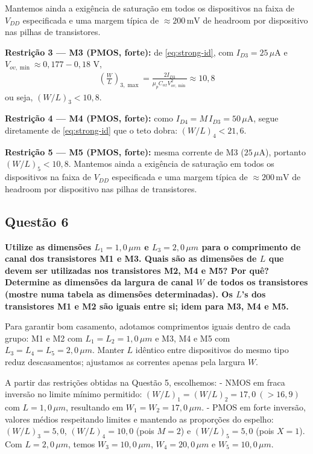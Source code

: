 ﻿\documentclass[12pt,a4paper]{article}
\begin{document}
Mantemos ainda a exigência de saturação em todos os dispositivos na faixa de $V_{DD}$ especificada e uma margem típica de $\approx 200\,\text{mV}$ de headroom por dispositivo nas pilhas de transistores.

	\textbf{Restrição 3 — M3 (PMOS, forte):} de \eqref{eq:strong-id}, com $I_{D3}=25\,\mu$A e $V_{ov,\min}\approx 0{,}177{-}0{,}18$ V,
\begin{align}
\left(\frac{W}{L}\right)_{3,\max}=\frac{2 I_{D3}}{\mu_p C_{ox} V_{ov,\min}^2}\approx \boxed{10{,}8}
\end{align}
ou seja, $\boxed{(W/L)_3<10{,}8}$.

	\textbf{Restrição 4 — M4 (PMOS, forte):} como $I_{D4}=M\,I_{D3}=50\,\mu$A, segue diretamente de \eqref{eq:strong-id} que o teto dobra: $\boxed{(W/L)_4<21{,}6}$.

	\textbf{Restrição 5 — M5 (PMOS, forte):} mesma corrente de M3 ($25\,\mu$A), portanto $\boxed{(W/L)_5<10{,}8}$.
Mantemos ainda a exigência de saturação em todos os dispositivos na faixa de $V_{DD}$ especificada e uma margem típica de $\approx 200\,\text{mV}$ de headroom por dispositivo nas pilhas de transistores.

\subsection*{Questão 6}
\begin{BoxQ}
    \textbf{Utilize as dimensões $L_1 = 1{,}0\,\mu m$ e $L_3 = 2{,}0\,\mu m$ para o comprimento de canal dos transistores M1 e M3. Quais são as dimensões de $L$ que devem ser utilizadas nos transistores M2, M4 e M5? Por quê? Determine as dimensões da largura de canal $W$ de todos os transistores (mostre numa tabela as dimensões determinadas). Os $L$’s dos transistores M1 e M2 são iguais entre si; idem para M3, M4 e M5.}\\
\end{BoxQ}\par

Para garantir bom casamento, adotamos comprimentos iguais dentro de cada grupo: M1 e M2 com $L_1=L_2=1{,}0\,\mu m$ e M3, M4 e M5 com $L_3=L_4=L_5=2{,}0\,\mu m$. Manter $L$ idêntico entre dispositivos do mesmo tipo reduz descasamentos; ajustamos as correntes apenas pela largura $W$.

A partir das restrições obtidas na Questão 5, escolhemos:
- NMOS em fraca inversão no limite mínimo permitido: $(W/L)_1 = (W/L)_2 = 17{,}0\ (>16{,}9)$ com $L=1{,}0\,\mu m$, resultando em $W_1=W_2=17{,}0\,\mu m$.
- PMOS em forte inversão, valores médios respeitando limites e mantendo as proporções do espelho: $(W/L)_3 = 5{,}0$, $(W/L)_4 = 10{,}0$ (pois $M=2$) e $(W/L)_5 = 5{,}0$ (pois $X=1$). Com $L=2{,}0\,\mu m$, temos $W_3=10{,}0\,\mu m$, $W_4=20{,}0\,\mu m$ e $W_5=10{,}0\,\mu m$.
\end{document}
